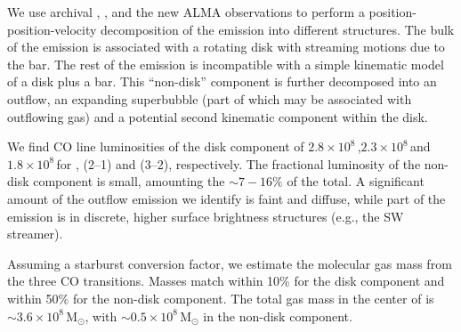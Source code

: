 We use archival , , and the new  ALMA observations to perform a position-position-velocity decomposition of the emission into different structures. The bulk of the emission is associated with a rotating disk with streaming motions due to the bar. The rest of the emission is incompatible with a simple kinematic model of a disk plus a bar. This ``non-disk'' component is further decomposed into an outflow, an expanding superbubble (part of which may be associated with outflowing gas) and a potential second kinematic component within the disk.

We find CO line luminosities of the disk component of $2.8\times10^8$\,\Kkmspc,\linebreak[4] $2.3\times10^8$\,\Kkmspc and $1.8\times10^8$\,\Kkmspc for , (2--1) and (3--2), respectively. The fractional luminosity of the non-disk component is small, amounting the $\sim7-16\%$ of the total.  A significant amount of the outflow emission we identify is faint and diffuse, while part of the emission is in discrete, higher surface brightness structures (e.g., the SW streamer).

Assuming a starburst conversion factor, we estimate the molecular gas mass from the three CO transitions. Masses match within 10\% for the disk component and within 50\% for the non-disk component. The total gas mass in the center of  is $\sim 3.6 \times 10^8$\,M$_\odot$, with $\sim 0.5 \times 10^8$\,M$_\odot$ in the non-disk component.

